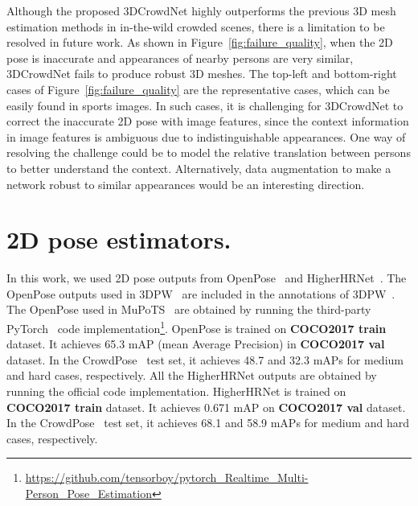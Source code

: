 \documentclass[10pt,twocolumn,letterpaper]{article}
\begin{document}
Although the proposed 3DCrowdNet highly outperforms the previous 3D mesh estimation methods in in-the-wild crowded scenes, there is a limitation to be resolved in future work.
As shown in Figure~\ref{fig:failure_quality}, when the 2D pose is inaccurate and appearances of nearby persons are very similar, 3DCrowdNet fails to produce robust 3D meshes.
The top-left and bottom-right cases of Figure~\ref{fig:failure_quality} are the representative cases, which can be easily found in sports images.
In such cases, it is challenging for 3DCrowdNet to correct the inaccurate 2D pose with image features, since the context information in image features is ambiguous due to indistinguishable appearances.
One way of resolving the challenge could be to model the relative translation between persons to better understand the context.
Alternatively, data augmentation to make a network robust to similar appearances would be an interesting direction.
 \section{2D pose estimators.}
\label{supp:2dpose}

In this work, we used 2D pose outputs from OpenPose~\cite{cao2017realtime} and HigherHRNet~\cite{cheng2020higherhrnet}.
The OpenPose outputs used in 3DPW~\cite{von20183dpw} are included in the annotations of 3DPW~\cite{von20183dpw}.
The OpenPose used in MuPoTS~\cite{mehta2018single} are obtained by running the third-party PyTorch~\cite{paszke2017automatic} code implementation\footnote{\url{https://github.com/tensorboy/pytorch\_Realtime\_Multi-Person\_Pose\_Estimation}}.
OpenPose is trained on \textbf{COCO2017 train}~\cite{lin2014mscoco} dataset.
It achieves 65.3 mAP (mean Average Precision) in \textbf{COCO2017 val} dataset.
In the CrowdPose~\cite{li2019crowdpose} test set, it achieves 48.7 and 32.3 mAPs for medium and hard cases, respectively.
All the HigherHRNet outputs are obtained by running the official code implementation.
HigherHRNet is trained on \textbf{COCO2017 train} dataset.
It achieves 0.671 mAP on \textbf{COCO2017 val} dataset.
In the CrowdPose~\cite{li2019crowdpose} test set, it achieves 68.1 and 58.9 mAPs for medium and hard cases, respectively.
 
\end{document}
